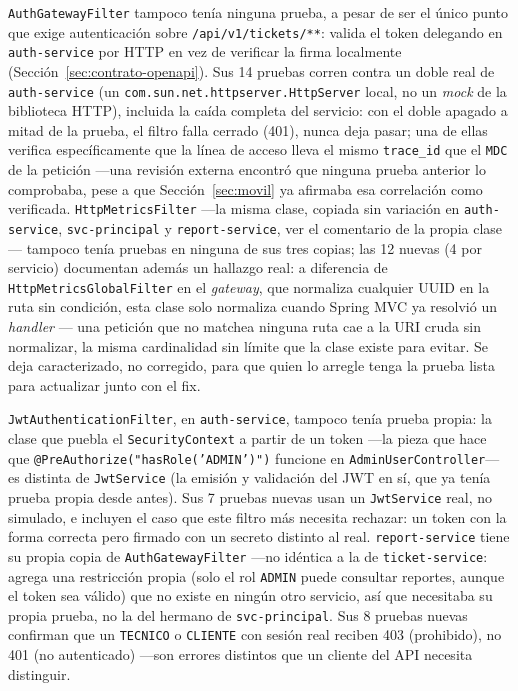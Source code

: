 \texttt{AuthGatewayFilter} tampoco tenía ninguna prueba, a pesar de ser el único punto que exige
autenticación sobre \texttt{/api/v1/tickets/**}: valida el token delegando en \texttt{auth-service}
por HTTP en vez de verificar la firma localmente (Sección~\ref{sec:contrato-openapi}). Sus 14
pruebas corren contra un doble real de \texttt{auth-service} (un
\texttt{com.sun.net.httpserver.HttpServer} local, no un \emph{mock} de la biblioteca HTTP),
incluida la caída completa del servicio: con el doble apagado a mitad de la prueba, el filtro
falla cerrado (401), nunca deja pasar; una de ellas verifica específicamente que la línea de
acceso lleva el mismo \texttt{trace\_id} que el \texttt{MDC} de la petición —una revisión externa
encontró que ninguna prueba anterior lo comprobaba, pese a que Sección~\ref{sec:movil} ya
afirmaba esa correlación como verificada. \texttt{HttpMetricsFilter} —la misma clase, copiada sin
variación en \texttt{auth-service}, \texttt{svc-principal} y \texttt{report-service}, ver el
comentario de la propia clase— tampoco tenía pruebas en ninguna de sus tres copias; las 12 nuevas
(4 por servicio) documentan además un hallazgo real: a diferencia de
\texttt{HttpMetricsGlobalFilter} en el \emph{gateway}, que normaliza cualquier UUID en la ruta sin
condición, esta clase solo normaliza cuando Spring MVC ya resolvió un \emph{handler} — una
petición que no matchea ninguna ruta cae a la URI cruda sin normalizar, la misma cardinalidad sin
límite que la clase existe para evitar. Se deja caracterizado, no corregido, para que quien lo
arregle tenga la prueba lista para actualizar junto con el fix.

\texttt{JwtAuthenticationFilter}, en \texttt{auth-service}, tampoco tenía prueba propia: la clase
que puebla el \texttt{SecurityContext} a partir de un token —la pieza que hace que
\texttt{@PreAuthorize("hasRole('ADMIN')")} funcione en \texttt{AdminUserController}— es distinta de
\texttt{JwtService} (la emisión y validación del JWT en sí, que ya tenía prueba propia desde antes).
Sus 7 pruebas nuevas usan un \texttt{JwtService} real, no simulado, e incluyen el caso que este
filtro más necesita rechazar: un token con la forma correcta pero firmado con un secreto distinto
al real. \texttt{report-service} tiene su propia copia de \texttt{AuthGatewayFilter} —no idéntica a
la de \texttt{ticket-service}: agrega una restricción propia (solo el rol \texttt{ADMIN} puede
consultar reportes, aunque el token sea válido) que no existe en ningún otro servicio, así que
necesitaba su propia prueba, no la del hermano de \texttt{svc-principal}. Sus 8 pruebas nuevas
confirman que un \texttt{TECNICO} o \texttt{CLIENTE} con sesión real reciben 403 (prohibido), no
401 (no autenticado) —son errores distintos que un cliente del API necesita distinguir.

